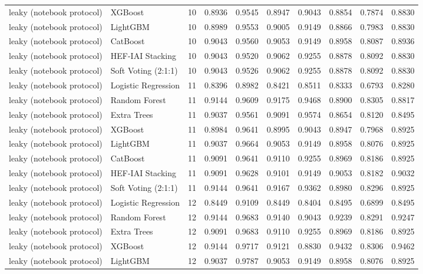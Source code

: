 \begin{tabular}{llrrrrrrrr}
leaky (notebook protocol) & XGBoost & 10 & 0.8936 & 0.9545 & 0.8947 & 0.9043 & 0.8854 & 0.7874 & 0.8830 \\
leaky (notebook protocol) & LightGBM & 10 & 0.8989 & 0.9553 & 0.9005 & 0.9149 & 0.8866 & 0.7983 & 0.8830 \\
leaky (notebook protocol) & CatBoost & 10 & 0.9043 & 0.9560 & 0.9053 & 0.9149 & 0.8958 & 0.8087 & 0.8936 \\
leaky (notebook protocol) & HEF-IAI Stacking & 10 & 0.9043 & 0.9520 & 0.9062 & 0.9255 & 0.8878 & 0.8092 & 0.8830 \\
leaky (notebook protocol) & Soft Voting (2:1:1) & 10 & 0.9043 & 0.9526 & 0.9062 & 0.9255 & 0.8878 & 0.8092 & 0.8830 \\
leaky (notebook protocol) & Logistic Regression & 11 & 0.8396 & 0.8982 & 0.8421 & 0.8511 & 0.8333 & 0.6793 & 0.8280 \\
leaky (notebook protocol) & Random Forest & 11 & 0.9144 & 0.9609 & 0.9175 & 0.9468 & 0.8900 & 0.8305 & 0.8817 \\
leaky (notebook protocol) & Extra Trees & 11 & 0.9037 & 0.9561 & 0.9091 & 0.9574 & 0.8654 & 0.8120 & 0.8495 \\
leaky (notebook protocol) & XGBoost & 11 & 0.8984 & 0.9641 & 0.8995 & 0.9043 & 0.8947 & 0.7968 & 0.8925 \\
leaky (notebook protocol) & LightGBM & 11 & 0.9037 & 0.9664 & 0.9053 & 0.9149 & 0.8958 & 0.8076 & 0.8925 \\
leaky (notebook protocol) & CatBoost & 11 & 0.9091 & 0.9641 & 0.9110 & 0.9255 & 0.8969 & 0.8186 & 0.8925 \\
leaky (notebook protocol) & HEF-IAI Stacking & 11 & 0.9091 & 0.9628 & 0.9101 & 0.9149 & 0.9053 & 0.8182 & 0.9032 \\
leaky (notebook protocol) & Soft Voting (2:1:1) & 11 & 0.9144 & 0.9641 & 0.9167 & 0.9362 & 0.8980 & 0.8296 & 0.8925 \\
leaky (notebook protocol) & Logistic Regression & 12 & 0.8449 & 0.9109 & 0.8449 & 0.8404 & 0.8495 & 0.6899 & 0.8495 \\
leaky (notebook protocol) & Random Forest & 12 & 0.9144 & 0.9683 & 0.9140 & 0.9043 & 0.9239 & 0.8291 & 0.9247 \\
leaky (notebook protocol) & Extra Trees & 12 & 0.9091 & 0.9683 & 0.9110 & 0.9255 & 0.8969 & 0.8186 & 0.8925 \\
leaky (notebook protocol) & XGBoost & 12 & 0.9144 & 0.9717 & 0.9121 & 0.8830 & 0.9432 & 0.8306 & 0.9462 \\
leaky (notebook protocol) & LightGBM & 12 & 0.9037 & 0.9787 & 0.9053 & 0.9149 & 0.8958 & 0.8076 & 0.8925 \\

\end{tabular}
